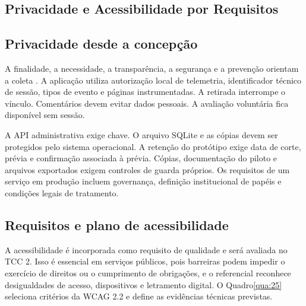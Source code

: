 \begin{apendicesenv}
\chapter{Privacidade e Acessibilidade por Requisitos}
\label{ap:J}

\section{Privacidade desde a concepção}
\label{sec:J.1}

A finalidade, a necessidade, a transparência, a segurança e a prevenção orientam a coleta \cite{brasil2018,cavoukian2011}. A aplicação utiliza autorização local de telemetria, identificador técnico de sessão, tipos de evento e páginas instrumentadas. A retirada interrompe o vínculo. Comentários devem evitar dados pessoais. A avaliação voluntária fica disponível sem sessão.

A API administrativa exige chave. O arquivo SQLite e as cópias devem ser protegidos pelo sistema operacional. A retenção do protótipo exige data de corte, prévia e confirmação associada à prévia. Cópias, documentação do piloto e arquivos exportados exigem controles de guarda próprios. Os requisitos de um serviço em produção incluem governança, definição institucional de papéis e condições legais de tratamento.

\section{Requisitos e plano de acessibilidade}
\label{sec:J.2}

A acessibilidade é incorporada como requisito de qualidade e será avaliada no TCC 2. Isso é essencial em serviços públicos, pois barreiras podem impedir o exercício de direitos ou o cumprimento de obrigações, e o referencial reconhece desigualdades de acesso, dispositivos e letramento digital. O Quadro\nobreakspace{}\ref{qua:25} seleciona critérios da WCAG 2.2 \cite{w3c2024} e define as evidências técnicas previstas.


\end{apendicesenv}
